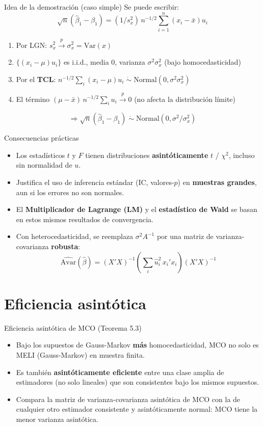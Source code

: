 \documentclass{beamer}
\begin{document}
\begin{frame}{Idea de la demostración (caso simple)}
Se puede escribir:
$$\sqrt{n}(\hat\beta_1 - \beta_1) = (1/s_x^2)\, n^{-1/2}\sum_{i=1}^n (x_i - \bar x)u_i$$
\begin{enumerate}
\item Por LGN: $s_x^2 \xrightarrow{p} \sigma_x^2 = \text{Var}(x)$
\item $\{(x_i-\mu)u_i\}$ es i.i.d., media 0, varianza $\sigma^2\sigma_x^2$ (bajo homocedasticidad)
\item Por el \textbf{TCL}: $n^{-1/2}\sum_i (x_i-\mu)u_i \;\dot\sim\; \text{Normal}(0,\sigma^2\sigma_x^2)$
\item El término $(\mu-\bar x)\,n^{-1/2}\sum_i u_i \xrightarrow{p} 0$ (no afecta la distribución límite)
\end{enumerate}
$$\Rightarrow \sqrt{n}(\hat\beta_1-\beta_1) \;\dot\sim\; \text{Normal}(0, \sigma^2/\sigma_x^2)$$
\end{frame}

\begin{frame}{Consecuencias prácticas}
\begin{itemize}
\item Los estadísticos $t$ y $F$ tienen distribuciones \textbf{asintóticamente} $t$ / $\chi^2$, incluso sin normalidad de $u$.
\item Justifica el uso de inferencia estándar (IC, valores-$p$) en \textbf{muestras grandes}, aun si los errores no son normales.
\item El \textbf{Multiplicador de Lagrange (LM)} y el \textbf{estadístico de Wald} se basan en estos mismos resultados de convergencia.
\item Con heterocedasticidad, se reemplaza $\sigma^2 A^{-1}$ por una matriz de varianza-covarianza \textbf{robusta}:
$$\widehat{\text{Avar}}(\hat\beta) = (X'X)^{-1}\left(\sum_i \hat u_i^2\, x_i'x_i\right)(X'X)^{-1}$$
\end{itemize}
\end{frame}

\section{Eficiencia asintótica}

\begin{frame}{Eficiencia asintótica de MCO (Teorema 5.3)}
\begin{itemize}
\item Bajo los supuestos de Gauss-Markov \textbf{más} homocedasticidad, MCO no solo es MELI (Gauss-Markov) en muestra finita.
\item Es también \textbf{asintóticamente eficiente} entre una clase amplia de estimadores (no solo lineales) que son consistentes bajo los mismos supuestos.
\item Compara la matriz de varianza-covarianza asintótica de MCO con la de cualquier otro estimador consistente y asintóticamente normal: MCO tiene la menor varianza asintótica.
\end{itemize}
\end{frame}
\end{document}

